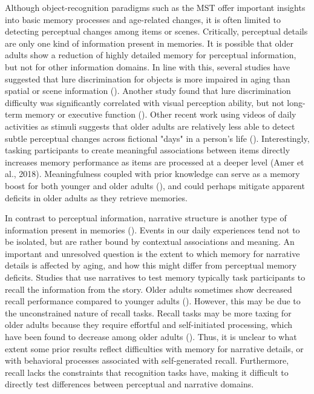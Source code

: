 \documentclass[11pt]{article}
\begin{document}
Although object-recognition paradigms such as the MST offer important insights into basic memory processes and age-related changes, it is often limited to detecting perceptual changes among items or scenes. Critically, perceptual details are only one kind of information present in memories. It is possible that older adults show a reduction of highly detailed memory for perceptual information, but not for other information domains. In line with this, several studies have suggested that lure discrimination for objects is more impaired in aging than spatial or scene information (\cite{gusten_age_2021, reagh_greater_2016, reagh_functional_2018}). Another study found that lure discrimination difficulty was significantly correlated with visual perception ability, but not long-term memory or executive function (\cite{davidson_older_2019}). Other recent work using videos of daily activities as stimuli suggests that older adults are relatively less able to detect subtle perceptual changes across fictional "days" in a person's life (\cite{wahlheim_memory_2019, stawarczyk_aging_2020}). Interestingly, tasking participants to create meaningful associations between items directly increases memory performance as items are processed at a deeper level (Amer et al., 2018). Meaningfulness coupled with prior knowledge can serve as a memory boost for both younger and older adults (\cite{skinner_roles_2019}), and could perhaps mitigate apparent deficits in older adults as they retrieve memories.

In contrast to perceptual information, narrative structure is another type of information present in memories (\cite{leon_architecture_2016, radvansky_novel_2005}). Events in our daily experiences tend not to be isolated, but are rather bound by contextual associations and meaning. An important and unresolved question is the extent to which memory for narrative details is affected by aging, and how this might differ from perceptual memory deficits. Studies that use narratives to test memory typically task participants to recall the information from the story. Older adults sometimes show decreased recall performance compared to younger adults (\cite{rhodes_age-related_2019}). However, this may be due to the unconstrained nature of recall tasks. Recall tasks may be more taxing for older adults because they require effortful and self-initiated processing, which have been found to decrease among older adults (\cite{rhodes_age-related_2019}). Thus, it is unclear to what extent some prior results reflect difficulties with memory for narrative details, or with behavioral processes associated with self-generated recall. Furthermore, recall lacks the constraints that recognition tasks have, making it difficult to directly test differences between perceptual and narrative domains.
\end{document}
